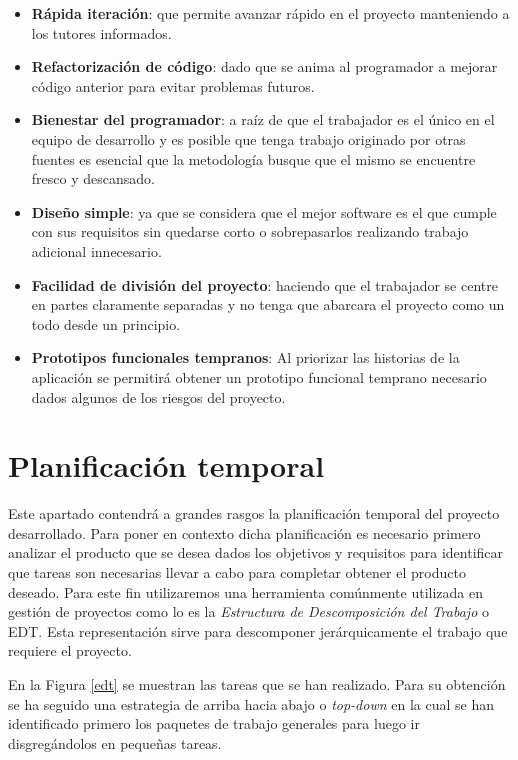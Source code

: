\begin{itemize}
	\item \textbf{Rápida iteración}: que permite avanzar rápido en el proyecto manteniendo a los tutores informados.
	\item \textbf{Refactorización de código}: dado que se anima al programador a mejorar código anterior para evitar problemas futuros.
	\item \textbf{Bienestar del programador}: a raíz de que el trabajador es el único en el equipo de desarrollo y es posible que tenga trabajo originado por otras fuentes es esencial que la metodología busque que el mismo se encuentre fresco y descansado.
	\item \textbf{Diseño simple}: ya que se considera que el mejor software es el que cumple con sus requisitos sin quedarse corto o sobrepasarlos realizando trabajo adicional innecesario.
	\item \textbf{Facilidad de división del proyecto}: haciendo que el trabajador se centre en partes claramente separadas y no tenga que abarcara el proyecto como un todo desde un principio.
	\item \textbf{Prototipos funcionales tempranos}: Al priorizar las historias de la aplicación se permitirá obtener un prototipo funcional temprano necesario dados algunos de los riesgos del proyecto.
\end{itemize}


\section{Planificación temporal}

Este apartado contendrá a grandes rasgos la planificación temporal del proyecto desarrollado. Para poner en contexto dicha planificación es necesario primero analizar el producto que se desea dados los objetivos y requisitos para identificar que tareas son necesarias llevar a cabo para completar obtener el producto deseado. Para este fin utilizaremos una herramienta comúnmente utilizada en gestión de proyectos como lo es la \textit{Estructura de Descomposición del Trabajo} o EDT. Esta representación sirve para descomponer jerárquicamente el trabajo que requiere el proyecto.

\bigskip

En la Figura \ref{edt} se muestran las tareas que se han realizado. Para su obtención se ha seguido una estrategia de arriba hacia abajo o \textit{top-down} en la cual se han identificado primero los paquetes de trabajo generales para luego ir disgregándolos en pequeñas tareas.

